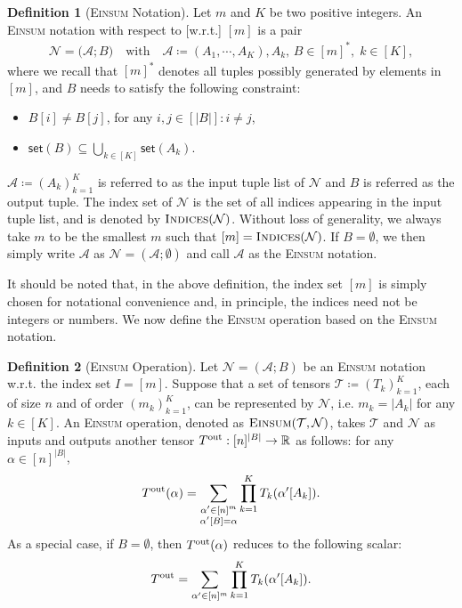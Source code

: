\documentclass[sn-mathphys, natbib=false]{sn-jnl}
\theoremstyle{plain}
\theoremstyle{definition}
\newtheorem{definition}{Definition}
\def\Einsum{\textsc{Einsum}}
\newcommand{\takesetp}[1]{\mathsf{set}(#1)}
\newcommand{\indexset}{\textsc{Indices}}
\newcommand{\tensorcontraction}{\textsc{Einsum}}
\newcommand{\reals}{{\mathbb{R}}}
\def\calA{\mathcal{A}}
\def\calT{\mathcal{T}}
\def\calN{\mathcal{N}}
\begin{document}
\begin{bibunit}[agsm]
\begin{definition}[\Einsum{} Notation]\label{def:tensor_expression}
Let $m$ and $K$ be two positive integers. An \Einsum{} notation with respect to [w.r.t.] $[m]$ is a pair
\begin{align*}
\calN = \big(\calA; B\big) \quad \text{with} \quad \calA \coloneqq (A_1, \cdots, A_K), A_k,\, B \in [m]^*, \; k \in [K],
\end{align*}
where we recall that $[m]^{\ast}$ denotes all tuples possibly generated by elements in $[m]$, and $B$ needs to satisfy the following constraint: 

\begin{itemize}
    \item $B[i] \neq B[j]$, for any $i, j \in [|B|]:i \neq j$, 
    \item $\takesetp{B} \subseteq \bigcup_{k \in [K]} \takesetp{A_k}$.
\end{itemize}
$\calA \coloneqq (A_k)_{k = 1}^{K}$ is referred to as the input tuple list of $\calN$ and $B$ is referred as the output tuple. The index set of $\calN$ is the set of all indices appearing in the input tuple list, and is denoted by $\indexset(\calN)$. Without loss of generality, we always take $m$ to be the smallest $m$ such that $[m] = \indexset(\calN)$. If $B = \emptyset$, we then simply write $\calA$ as $\calN = (\calA; \emptyset)$ and call $\calA$ as the \Einsum{} notation.
\end{definition}

It should be noted that, in the above definition, the index set $[m]$ is simply chosen for notational convenience and, in principle, the indices need not be integers or numbers. We now define the \Einsum{} operation based on the \Einsum{} notation.

\begin{definition}[\Einsum{} Operation]
\label{def:tensor_contraction}  
Let $\calN = (\calA; B)$ be an \Einsum{} notation w.r.t. the index set $I = [m]$. Suppose that a set of tensors $\calT \coloneqq (T_k)_{k=1}^K$, each of size $n$ and of order $(m_k)_{k = 1}^{K}$, can be represented by $\calN$, i.e. $m_k = |A_k|$ for any $k \in [K]$. An \Einsum{} operation, denoted as $\tensorcontraction(\calT, \calN)$, takes $\calT$ and $\calN$ as inputs and outputs another tensor $T^{\rm out}: [n]^{|B|} \rightarrow \reals$ as follows: for any $\alpha \in [n]^{|B|}$, 
   \begin{align*}
        T^{\rm out} (\alpha) = \sum_{\substack{\alpha^\prime \in [n]^m \\ \alpha'[B] = \alpha}} \prod_{k=1}^K T_k(\alpha^\prime[A_k]).
    \end{align*} 
As a special case, if $B = \emptyset$, then $T^{\rm out} (\alpha)$ reduces to the following scalar:
\begin{align*}
    T^{\rm out} = \sum_{\alpha^\prime \in [n]^m}\prod_{k=1}^K T_k(\alpha^\prime[A_k]).
\end{align*}
\end{definition}


\end{bibunit}
\end{document}
